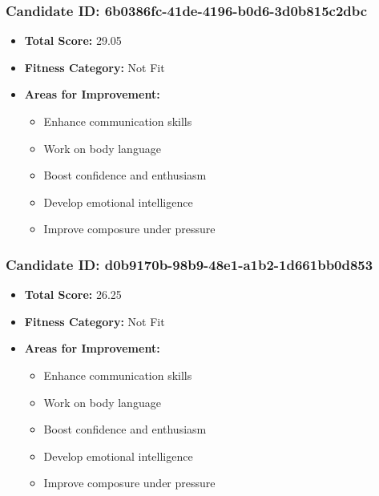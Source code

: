\documentclass{article}
\begin{document}
\subsubsection{Candidate ID: 6b0386fc-41de-4196-b0d6-3d0b815c2dbc}
\begin{itemize}
    \item \textbf{Total Score:} 29.05
    \item \textbf{Fitness Category:} Not Fit
    \item \textbf{Areas for Improvement:}
    \begin{itemize}
        \item Enhance communication skills
        \item Work on body language
        \item Boost confidence and enthusiasm
        \item Develop emotional intelligence
        \item Improve composure under pressure
    \end{itemize}
\end{itemize}

\subsubsection{Candidate ID: d0b9170b-98b9-48e1-a1b2-1d661bb0d853}
\begin{itemize}
    \item \textbf{Total Score:} 26.25
    \item \textbf{Fitness Category:} Not Fit
    \item \textbf{Areas for Improvement:}
    \begin{itemize}
        \item Enhance communication skills
        \item Work on body language
        \item Boost confidence and enthusiasm
        \item Develop emotional intelligence
        \item Improve composure under pressure
    \end{itemize}
\end{itemize}
\end{document}
